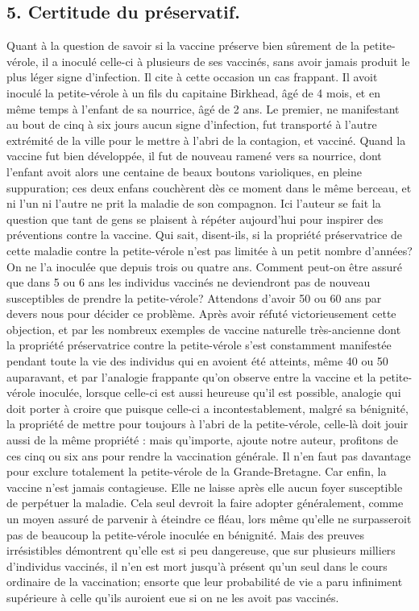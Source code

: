 \subsection{5. Certitude du préservatif.}
Quant à la question de savoir si la vaccine préserve bien sûrement de la petite-vérole, il a inoculé celle-ci à plusieurs de ses vaccinés, sans avoir jamais produit le plus léger signe d'infection. Il cite à cette occasion un cas frappant. Il avoit inoculé la petite-vérole à un fils du capitaine Birkhead, âgé de 4 mois, et en même temps à l'enfant de sa nourrice, âgé de 2 ans. Le premier, ne manifestant au bout de cinq à six jours aucun signe d'infection, fut transporté à l'autre extrémité de la ville pour le mettre à l'abri de la contagion, et vacciné. Quand la vaccine fut bien développée, il fut de nouveau ramené vers sa nourrice, dont l'enfant avoit alors une centaine de beaux boutons varioliques, en pleine suppuration; ces deux enfans couchèrent dès ce moment dans le même berceau, et ni l'un ni l'autre ne prit la maladie de son compagnon.
Ici l'auteur se fait la question que tant de gens se plaisent à répéter aujourd'hui pour\setcounter{page}{385} inspirer des préventions contre la vaccine. Qui sait, disent-ils, si la propriété préservatrice de cette maladie contre la petite-vérole n'est pas limitée à un petit nombre d'années? On ne l'a inoculée que depuis trois ou quatre ans. Comment peut-on être assuré que dans 5 ou 6 ans les individus vaccinés ne deviendront pas de nouveau susceptibles de prendre la petite-vérole? Attendons d'avoir 50 ou 60 ans par devers nous pour décider ce problème. Après avoir réfuté victorieusement cette objection, et par les nombreux exemples de vaccine naturelle très-ancienne dont la propriété préservatrice contre la petite-vérole s'est constamment manifestée pendant toute la vie des individus qui en avoient été atteints, même 40 ou 50 auparavant, et par l'analogie frappante qu'on observe entre la vaccine et la petite-vérole inoculée, lorsque celle-ci est aussi heureuse qu'il est possible, analogie qui doit porter à croire que puisque celle-ci a incontestablement, malgré sa bénignité, la propriété de mettre pour toujours à l'abri de la petite-vérole, celle-là doit jouir aussi de la même propriété : mais qu'importe, ajoute notre auteur, profitons de ces cinq ou six ans pour rendre la vaccination générale. Il n'en faut pas davantage pour exclure totalement la petite-vérole de la Grande-Bretagne.
\setcounter{page}{386}
Car enfin, la vaccine n'est jamais contagieuse. Elle ne laisse après elle aucun foyer susceptible de perpétuer la maladie. Cela seul devroit la faire adopter généralement, comme un moyen assuré de parvenir à éteindre ce fléau, lors même qu'elle ne surpasseroit pas de beaucoup la petite-vérole inoculée en bénignité. Mais des preuves irrésistibles démontrent qu'elle est si peu dangereuse, que sur plusieurs milliers d'individus vaccinés, il n'en est mort jusqu'à présent qu'un seul dans le cours ordinaire de la vaccination; ensorte que leur probabilité de vie a paru infiniment supérieure à celle qu'ils auroient eue si on ne les avoit pas vaccinés.
